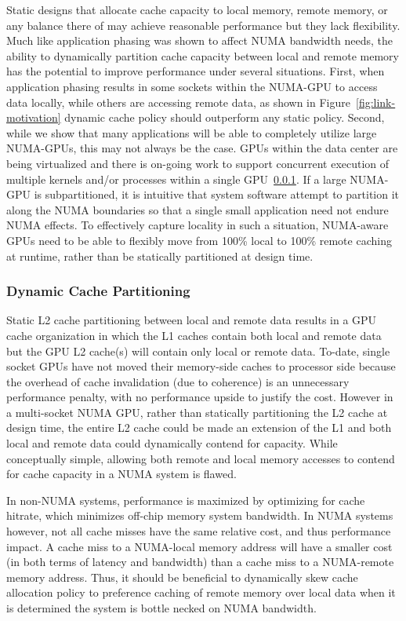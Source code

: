 Static designs that allocate cache capacity to local memory, remote memory, or any
balance there of may achieve reasonable performance but they lack flexibility.  Much
like application phasing was shown to affect NUMA bandwidth needs, the ability to
dynamically partition cache capacity between local and remote memory has the potential
to improve performance under several situations.  First, when application phasing
results in some sockets within the NUMA-GPU to access data locally, while others
are accessing remote data, as shown in Figure~\ref{fig:link-motivation} dynamic
cache policy should outperform any static policy.  Second, while we show that many
applications will be able to completely utilize large NUMA-GPUs, this may not always
be the case.  GPUs within the data center are being virtualized and there is on-going
work to support concurrent execution of multiple kernels and/or processes within a
single GPU~\ref{}. If a large NUMA-GPU is subpartitioned, it is intuitive that system
software attempt to partition it along the NUMA boundaries so that a single small
application need not endure NUMA effects.  To effectively capture locality in such
a situation, NUMA-aware GPUs need to be able to flexibly move from 100\% local to
100\% remote caching at runtime, rather than be statically partitioned at design time.

\subsubsection{Dynamic Cache Partitioning}

Static L2 cache partitioning between local and remote data results in a GPU cache
organization in which the L1 caches contain both local and remote data but the GPU
L2 cache(s) will contain only local or remote data.  To-date, single socket GPUs
have not moved their memory-side caches to processor side because the overhead of
cache invalidation (due to coherence) is an unnecessary performance penalty, with
no performance upside to justify the cost.  However in a multi-socket NUMA GPU,
rather than statically partitioning the L2 cache at design time, the entire L2 cache
could be made an extension of the L1 and both local and remote data could dynamically
contend for capacity.  While conceptually simple, allowing both remote and local
memory accesses to contend for cache capacity in a NUMA system is flawed.

In non-NUMA systems, performance is maximized by optimizing for cache hitrate, which
minimizes off-chip memory system bandwidth.  In NUMA systems however, not all cache
misses have the same relative cost, and thus performance impact.  A cache miss to a 
NUMA-local memory address will have a smaller cost (in both terms of latency and bandwidth)
than a cache miss to a NUMA-remote memory address.  Thus, it should be beneficial
to dynamically skew cache allocation policy to preference caching of remote memory over local
data when it is determined the system is bottle necked on NUMA bandwidth.

